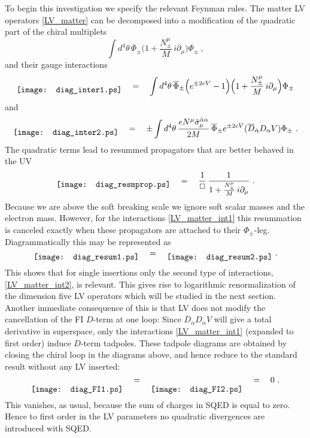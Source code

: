 \documentclass[12pt]{revtex4}
\begin{document}
To begin this investigation we specify the relevant Feynman rules. 
The matter LV operators \eqref{LV_matter} can be decomposed into
a modification of the quadratic part of the chiral multiplets 
\begin{equation} 
\int d^4\theta\, 
\overline{\Phi}_\pm 
\Big( 1 + \frac{N_\pm^\mu}{M} \, i \partial_\mu  \Big) 
\Phi_\pm~, 
\end{equation}
and their gauge interactions
\begin{equation} 
\raisebox{-1ex}{\texttt{[image: diag\_inter1.ps]}}
\quad = \quad 
\int d^4\theta\, 
\overline{\Phi}_\pm 
\Big(  e^{\pm 2 e V} - 1 \Big) 
\Big( 1 + \frac{N_\pm^\mu}{M} \, i \partial_\mu  \Big) 
\Phi_\pm
\label{LV_matter_int1}
\end{equation}
and 
\begin{equation}
\raisebox{-1ex}{\texttt{[image: diag\_inter2.ps]}}
\quad = \quad 
\pm \int d^4\theta\, 
\frac {e N^\mu \bar\sigma_\mu^{\dot\alpha\alpha}}{2M}\, 
\overline{\Phi}_\pm 
e^{\pm 2eV} 
( \overline{D}_{\dot\alpha} D_\alpha V) 
\Phi_\pm~. 
\label{LV_matter_int2}
\end{equation} 
The quadratic terms lead to resummed  propagators that are better
behaved in the UV 
\begin{equation} 
\raisebox{-1ex}{\texttt{[image: diag\_resmprop.ps]}}
\quad = \quad 
\frac 1{\Box}\,  \frac 1{1 +  \frac{ N_\pm^\mu} M \, i\partial_\mu}~. 
\end{equation} 
Because we are above the soft breaking scale we ignore soft scalar 
masses and the electron mass.
However, for the interactions \eqref{LV_matter_int1} this 
resummation is canceled exactly when these propagators are 
attached to their $\Phi_\pm$-leg. Diagrammatically this may be
represented as  
\begin{equation}
\raisebox{-1ex}{\texttt{[image: diag\_resum1.ps]}}
\quad = \quad 
\raisebox{-1ex}{\texttt{[image: diag\_resum2.ps]}}
~. 
\label{ResummedPropVer}
\end{equation}
This shows that for single insertions only the second type of
interactions, \eqref{LV_matter_int2}, is relevant. This gives rise to
logarithmic renormalization of the dimension five LV operators which
will be studied in the next section. 
Another immediate consequence of this is that LV does not 
modify the cancellation of the FI $D$-term at one loop: Since
$\overline{D}_{\dot\alpha} D_\alpha V$ will give a total derivative in
superspace, only the interactions \eqref{LV_matter_int1} (expanded to
first order) induce $D$-term tadpoles. These tadpole diagrams are
obtained by closing the chiral loop in the diagrams above, and hence
reduce to the standard result without any LV inserted: 
\begin{equation}
\raisebox{-2.5ex}{\texttt{[image: diag\_FI1.ps]}}
\quad = \quad 
\raisebox{-2.5ex}{\texttt{[image: diag\_FI2.ps]}}
\quad = \quad 0~. 
\end{equation}
This vanishes, as usual, because the sum of charges in SQED is equal
to zero. Hence to first order in the LV parameters no quadratic
divergences are introduced with SQED. 
\end{document}
